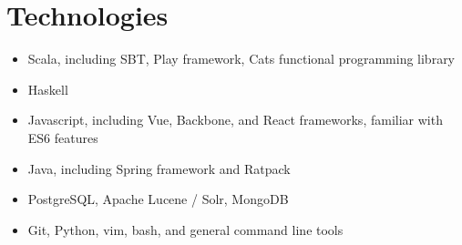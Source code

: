 \documentclass[10pt]{article}
\begin{document}
\section*{Technologies}
\begin{multicols}{2}
\begin{itemize}
    \itemsep0em
    \item Scala, including SBT, Play framework, Cats functional programming library
    \item Haskell
    \item Javascript, including Vue, Backbone, and React frameworks, familiar with ES6 features
    \item Java, including Spring framework and Ratpack
    \item PostgreSQL, Apache Lucene / Solr, MongoDB
    \item Git, Python, vim, bash, and general command line tools
\end{itemize}
\end{multicols}
\end{document}

